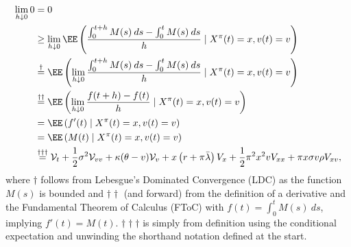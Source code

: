 \documentclass[11pt]{article}
\numberwithin{equation}{section}
\begin{document}
\begin{align*}
    \lim_{h\downarrow 0}0&=0\\
    &\geq \lim_{h\downarrow 0}\EE \left ( \frac{\int_0^{t+h}M(s)\:ds-\int_0^{t}M(s)\:ds}{h} \mid X^\pi(t)=x,v(t)=v \right )\\
    &\overset{\dagger}{=}\EE \left (\lim_{h\downarrow 0} \frac{\int_0^{t+h}M(s)\:ds-\int_0^{t}M(s)\:ds}{h} \mid X^\pi(t)=x,v(t)=v \right )\\
    &\overset{\dagger\dagger}{=}\EE \left (\lim_{h\downarrow 0} \frac{f(t+h)-f(t)}{h} \mid X^\pi(t)=x,v(t)=v \right )\\
    &=\EE \left ( f'(t) \mid X^\pi(t)=x,v(t)=v \right )\\
    &=\EE \left ( M(t) \mid X^\pi(t)=x,v(t)=v \right )\\
    &\overset{\dagger\dagger\dagger}{=}\mathcal{V}_t + \frac{1}{2}\sigma^2 \mathcal{V}_{vv}+\kappa(\theta-v)\mathcal{V}_v+ x\left(r + \pi\bar{\lambda} \right)V_x + \frac{1}{2}\pi^2x^2vV_{xx} + \pi x \sigma v \rho V_{xv},
\end{align*}
where $\dagger$ follows from Lebesgue's Dominated Convergence (LDC) as the
function $M(s)$ is bounded and
$\dagger\dagger$ (and forward) from the definition of a derivative and the
Fundamental Theorem of Calculus (FToC) with $f(t)=\int_0^t
M(s)\:ds$, implying $f'(t)=M(t)$. $\dagger\dagger\dagger$ is
simply from definition using the conditional expectation and unwinding the shorthand notation defined at the start.
\end{document}

